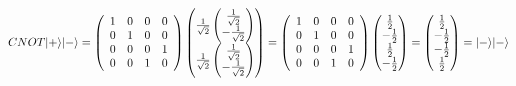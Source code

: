 \documentclass{article}
\DeclarePairedDelimiter\ket{\lvert}{\rangle}
\begin{document}
\[CNOT \ket{+}\ket{-}  =  \left(
    \begin{array}{cccc} 
        1 & 0 & 0 & 0\\
        0 & 1 & 0 & 0\\
        0 & 0 & 0 & 1\\
        0 & 0 & 1 & 0
    \end{array} 
\right)\begin{pmatrix} \frac{1}{\sqrt{2}} \begin{pmatrix} \frac{1}{\sqrt{2}} \\ -\frac{1}{\sqrt{2}} \end{pmatrix} \\ \frac{1}{\sqrt{2}} \begin{pmatrix} \frac{1}{\sqrt{2}} \\ -\frac{1}{\sqrt{2}} \end{pmatrix} \end{pmatrix} = \left(
    \begin{array}{cccc} 
        1 & 0 & 0 & 0\\
        0 & 1 & 0 & 0\\
        0 & 0 & 0 & 1\\
        0 & 0 & 1 & 0
    \end{array} 
\right)\begin{pmatrix} \frac{1}{2} \\ -\frac{1}{2} \\ \frac{1}{2} \\ -\frac{1}{2}  \end{pmatrix} = \begin{pmatrix} \frac{1}{2} \\ -\frac{1}{2} \\ -\frac{1}{2} \\ \frac{1}{2}  \end{pmatrix} = \ket{-}\ket{-} \]
\end{document}
